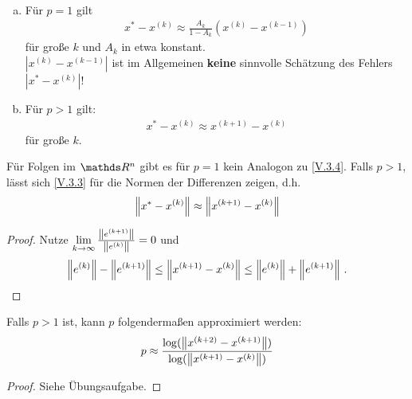 \begin{Fole}~
  \begin{enumerate}[a)]
  \item Für $p=1$ gilt
    \begin{gather}
      x^{*}-x^{(k)} \approx \frac{A_k}{1-A_k}(x^{(k)}-x^{(k-1)})
      \label{V.3.4}
    \end{gather}
    für große $k$ und $A_k$ in etwa konstant. \\
    $|x^{(k)}-x^{(k-1)}|$ ist im Allgemeinen \textbf{keine} sinnvolle Schätzung
    des Fehlers $|x^{*}-x^{(k)}|$!
  \item Für $p>1$ gilt:
    \begin{gather}
      x^{*}-x^{(k)} \approx x^{(k+1)}-x^{(k)}
      \label{V.3.5}
    \end{gather}
    für große $k$.
  \end{enumerate}
\end{Fole}


\begin{Beme}
  Für Folgen im $\R^n$ gibt es für $p=1$ kein Analogon zu \eqref{V.3.4}.
  Falls $p>1$, lässt sich \eqref{V.3.3} für die Normen der Differenzen zeigen,
  d.h.
  \begin{gather}
    \left\| x^{*}-x^{(k)} \right\| \approx \left\| x^{(k+1)}-x^{(k)} \right\|
    \label{V.3.6}
  \end{gather}
  
  \begin{proof}
    Nutze $\lim\limits_{k\rightarrow\infty} \frac{\left\| e^{(k+1)} \right\|}{\left\| e^{(k)} \right\|} =0$
    und 
    \begin{gather*}
      \left\| e^{(k)} \right\|-\left\| e^{(k+1)} \right\|\leq \left\| x^{(k+1)}-x^{(k)} \right\| \leq \left\| e^{(k)} \right\|+\left\| e^{(k+1)} \right\| \, .
    \end{gather*}
  \end{proof}
\end{Beme}


\begin{Fole}
  Falls $p>1$ ist, kann $p$ folgendermaßen approximiert werden:
  \begin{gather*}
    p \approx \frac{\log(\left\| x^{(k+2)}-x^{(k+1)} \right\|)}{\log(\left\| x^{(k+1)}-x^{(k)} \right\|)}
  \end{gather*}
\end{Fole}

\begin{proof}
  Siehe Übungsaufgabe.
\end{proof}


